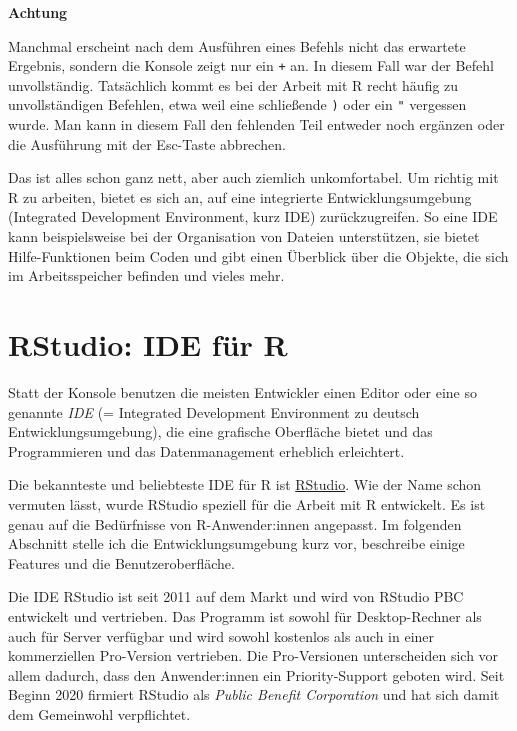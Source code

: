 \documentclass[
]{book}
\begin{document}
\leavevmode\hypertarget{warning_non_complete}{}%
\textbf{Achtung}

Manchmal erscheint nach dem Ausführen eines Befehls nicht das erwartete Ergebnis, sondern die Konsole zeigt nur ein \texttt{+} an. In diesem Fall war der Befehl unvollständig. Tatsächlich kommt es bei der Arbeit mit R recht häufig zu unvollständigen Befehlen, etwa weil eine schließende \texttt{)} oder ein \texttt{"} vergessen wurde. Man kann in diesem Fall den fehlenden Teil entweder noch ergänzen oder die Ausführung mit der Esc-Taste abbrechen.

Das ist alles schon ganz nett, aber auch ziemlich unkomfortabel. Um richtig mit R zu arbeiten, bietet es sich an, auf eine integrierte Entwicklungsumgebung (Integrated Development Environment, kurz IDE) zurückzugreifen.
So eine IDE kann beispielsweise bei der Organisation von Dateien unterstützen, sie bietet Hilfe-Funktionen beim Coden und gibt einen Überblick über die Objekte, die sich im Arbeitsspeicher befinden und vieles mehr.

\hypertarget{rstudio-ide-fuxfcr-r}{%
\section{RStudio: IDE für R}\label{rstudio-ide-fuxfcr-r}}

Statt der Konsole benutzen die meisten Entwickler einen Editor oder eine so genannte \emph{IDE} (= Integrated Development Environment zu deutsch Entwicklungsumgebung), die eine grafische Oberfläche bietet und das Programmieren und das Datenmanagement erheblich erleichtert.

Die bekannteste und beliebteste IDE für R ist \href{https://rstudio.com/}{RStudio}.
Wie der Name schon vermuten lässt, wurde RStudio speziell für die Arbeit mit R entwickelt. Es ist genau auf die Bedürfnisse von R-Anwender:innen angepasst. Im folgenden Abschnitt stelle ich die Entwicklungsumgebung kurz vor, beschreibe einige Features und die Benutzeroberfläche.

Die IDE RStudio ist seit 2011 auf dem Markt und wird von RStudio PBC entwickelt und vertrieben.
Das Programm ist sowohl für Desktop-Rechner als auch für Server verfügbar und wird sowohl kostenlos als auch in einer kommerziellen Pro-Version vertrieben.
Die Pro-Versionen unterscheiden sich vor allem dadurch, dass den Anwender:innen ein Priority-Support geboten wird.
Seit Beginn 2020 firmiert RStudio als \emph{Public Benefit Corporation} und hat sich damit dem Gemeinwohl verpflichtet.
\end{document}

